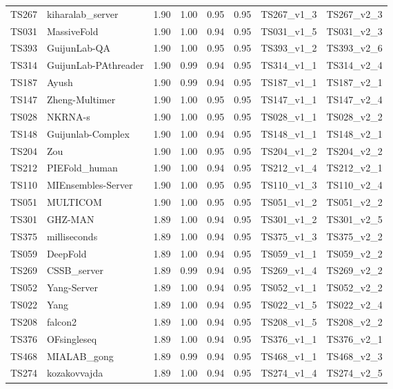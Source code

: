 \begin{longtable}{llllllll}
TS267 & kiharalab\_server & 1.90 & 1.00 & 0.95 & 0.95 & TS267\_v1\_3 & TS267\_v2\_3 \\ 
TS031 & MassiveFold & 1.90 & 1.00 & 0.94 & 0.95 & TS031\_v1\_5 & TS031\_v2\_3 \\ 
TS393 & GuijunLab-QA & 1.90 & 1.00 & 0.95 & 0.95 & TS393\_v1\_2 & TS393\_v2\_6 \\ 
TS314 & GuijunLab-PAthreader & 1.90 & 0.99 & 0.94 & 0.95 & TS314\_v1\_1 & TS314\_v2\_4 \\ 
TS187 & Ayush & 1.90 & 0.99 & 0.94 & 0.95 & TS187\_v1\_1 & TS187\_v2\_1 \\ 
TS147 & Zheng-Multimer & 1.90 & 1.00 & 0.95 & 0.95 & TS147\_v1\_1 & TS147\_v2\_4 \\ 
TS028 & NKRNA-s & 1.90 & 1.00 & 0.95 & 0.95 & TS028\_v1\_1 & TS028\_v2\_2 \\ 
TS148 & Guijunlab-Complex & 1.90 & 1.00 & 0.94 & 0.95 & TS148\_v1\_1 & TS148\_v2\_1 \\ 
TS204 & Zou & 1.90 & 1.00 & 0.95 & 0.95 & TS204\_v1\_2 & TS204\_v2\_2 \\ 
TS212 & PIEFold\_human & 1.90 & 1.00 & 0.94 & 0.95 & TS212\_v1\_4 & TS212\_v2\_1 \\ 
TS110 & MIEnsembles-Server & 1.90 & 1.00 & 0.95 & 0.95 & TS110\_v1\_3 & TS110\_v2\_4 \\ 
TS051 & MULTICOM & 1.90 & 1.00 & 0.95 & 0.95 & TS051\_v1\_2 & TS051\_v2\_2 \\ 
TS301 & GHZ-MAN & 1.89 & 1.00 & 0.94 & 0.95 & TS301\_v1\_2 & TS301\_v2\_5 \\ 
TS375 & milliseconds & 1.89 & 1.00 & 0.94 & 0.95 & TS375\_v1\_3 & TS375\_v2\_2 \\ 
TS059 & DeepFold & 1.89 & 1.00 & 0.94 & 0.95 & TS059\_v1\_1 & TS059\_v2\_2 \\ 
TS269 & CSSB\_server & 1.89 & 0.99 & 0.94 & 0.95 & TS269\_v1\_4 & TS269\_v2\_2 \\ 
TS052 & Yang-Server & 1.89 & 1.00 & 0.94 & 0.95 & TS052\_v1\_1 & TS052\_v2\_2 \\ 
TS022 & Yang & 1.89 & 1.00 & 0.94 & 0.95 & TS022\_v1\_5 & TS022\_v2\_4 \\ 
TS208 & falcon2 & 1.89 & 1.00 & 0.94 & 0.95 & TS208\_v1\_5 & TS208\_v2\_2 \\ 
TS376 & OFsingleseq & 1.89 & 1.00 & 0.94 & 0.95 & TS376\_v1\_1 & TS376\_v2\_1 \\ 
TS468 & MIALAB\_gong & 1.89 & 0.99 & 0.94 & 0.95 & TS468\_v1\_1 & TS468\_v2\_3 \\ 
TS274 & kozakovvajda & 1.89 & 1.00 & 0.94 & 0.95 & TS274\_v1\_4 & TS274\_v2\_5 \\ 

\end{longtable}
